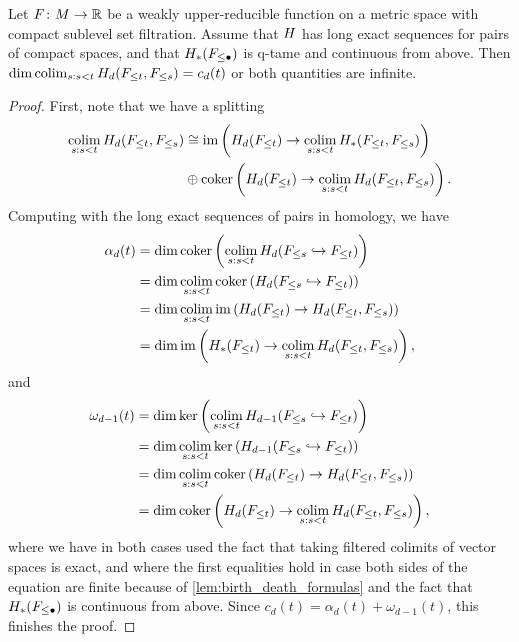\begin{prop}\label{prop:cap_limits}
	Let $F \colon M \to \mathbb{R}$ be a weakly upper-reducible function on a metric space with compact sublevel set filtration.
	Assume that $H$ has long exact sequences for pairs of compact spaces, and that $H_*(F_{\leq \bullet})$ is q-tame and continuous from above.
	Then $\dim \operatorname*{colim}_{s: s < t} H_d(F_{\leq t}, F_{\leq s}) = c_d(t)$ or both quantities are infinite.
\end{prop}
\begin{proof}
	First, note that we have a splitting 
	\begin{align*}
	\operatorname*{colim}_{s: s < t} H_d(F_{\leq t}, F_{\leq s}) 
	&\cong \operatorname{im} \left( H_d(F_{\leq t}) \to \operatorname*{colim}_{s: s < t} H_*(F_{\leq t}, F_{\leq s}) \right) \\
	&\oplus \operatorname{coker} \left( H_d(F_{\leq t}) \to \operatorname*{colim}_{s: s < t} H_d(F_{\leq t}, F_{\leq s}) \right).
	\end{align*}
    Computing with the long exact sequences of pairs in homology, we have
    \begin{align*}
        \alpha_d(t)
        &= \dim \operatorname{coker} \left( \operatorname*{colim}_{s: s < t} H_d(F_{\leq s} \hookrightarrow F_{\leq t}) \right) \\
        &= \dim \operatorname*{colim}_{s: s < t} \operatorname{coker} \left( H_d(F_{\leq s} \hookrightarrow F_{\leq t}) \right) \\
        &= \dim \operatorname*{colim}_{s: s < t} \operatorname{im} \left( H_d(F_{\leq t}) \to H_d(F_{\leq t}, F_{\leq s}) \right) \\
        &= \dim \operatorname{im} \left( H_*(F_{\leq t}) \to \operatorname*{colim}_{s: s < t} H_d(F_{\leq t}, F_{\leq s}) \right), \\
    \end{align*}
    and
    \begin{align*}
    	\omega_{d-1}(t)
        &= \dim \ker \left( \operatorname*{colim}_{s: s < t} H_{d-1}(F_{\leq s} \hookrightarrow F_{\leq t}) \right) \\
        &= \dim \operatorname*{colim}_{s: s < t} \ker \left( H_{d-1}(F_{\leq s} \hookrightarrow F_{\leq t}) \right) \\
        &= \dim \operatorname*{colim}_{s: s < t} \operatorname{coker} \left( H_d(F_{\leq t}) \to H_d(F_{\leq t}, F_{\leq s}) \right) \\
        &= \dim \operatorname{coker} \left( H_d(F_{\leq t}) \to \operatorname*{colim}_{s: s < t} H_d(F_{\leq t}, F_{\leq s}) \right), \\
    \end{align*}
    where we have in both cases used the fact that taking filtered colimits of vector spaces is exact, and where the first equalities hold in case both sides of the equation are finite because of \cref{lem:birth_death_formulas} and the fact that $H_*(F_{\leq \bullet})$ is continuous from above.
	Since $c_d(t) = \alpha_d(t) + \omega_{d-1}(t)$, this finishes the proof.
\end{proof}

